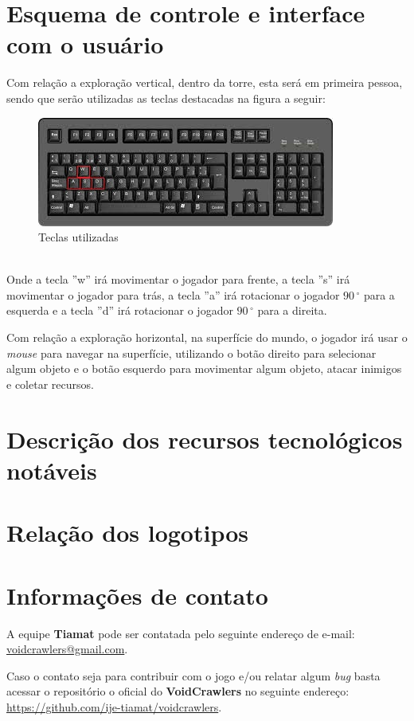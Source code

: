 \documentclass[11pt]{article} %
\begin{document}
\section*{Esquema de controle e interface com o usuário}
Com relação a exploração vertical, dentro da torre, esta será em primeira pessoa, sendo que serão utilizadas as teclas destacadas na figura a seguir:\\
\begin{figure}[!htp]
\centering
\includegraphics[scale=0.75]{imagens/teclado.jpg}
\caption{Teclas utilizadas}
\label{Teclado}
\end{figure}
\\Onde a tecla ''w'' irá movimentar o jogador para frente, a tecla ''s'' irá movimentar o jogador para trás, a tecla ''a'' irá rotacionar o jogador $90\,^{\circ}$ para a esquerda e a tecla ''d'' irá rotacionar o jogador $90\,^{\circ}$ para a direita.

Com relação a exploração horizontal, na superfície do mundo, o jogador irá usar o \textit{mouse} para navegar na superfície, utilizando o botão direito para selecionar algum objeto e o botão esquerdo para movimentar algum objeto, atacar inimigos e coletar recursos. 
\section*{Descrição dos recursos tecnológicos notáveis}
\section*{Relação dos logotipos}
\section*{Informações de contato}
A equipe \textbf{Tiamat} pode ser contatada pelo seguinte endereço de e-mail: \url{voidcrawlers@gmail.com}.

Caso o contato seja para contribuir com o jogo e/ou relatar algum \textit{bug} basta acessar o repositório o oficial do \textbf{VoidCrawlers} no seguinte endereço: \url{https://github.com/ije-tiamat/voidcrawlers}.
\end{document}
